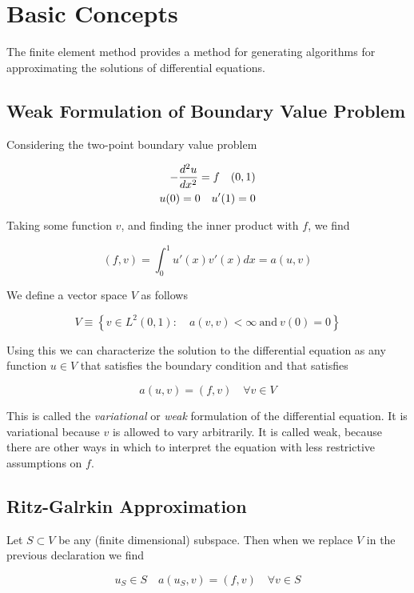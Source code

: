 \documentclass[../FEM.tex]{subfiles}
\begin{document}
\section{Basic Concepts}
\label{sec:basic-concepts}

The finite element method provides a method for generating algorithms
for approximating the solutions of differential equations.

\subsection{Weak Formulation of Boundary Value Problem}
\label{sub:weak-formulation-of-boundary-value-problem}

Considering the two-point boundary value problem

\[
\begin{aligned}
-\frac{d^2 u}{d {x}^2}=f\quad(0,1)\\
u(0)=0\quad u'(1)=0
\end{aligned}
\]

Taking some function \(v\), and finding the inner product with \(f\), we
find

\[
(f,v)=\int_{0}^{1}u'(x)v'(x)dx=a(u,v)
\]

We define a vector space \(V\) as follows

\[
V \equiv \left\{ v\in L^2(0,1):\quad a(v,v)< \infty \ \text{and}\ v(0) = 0\right\}
\]

Using this we can characterize the solution to the differential equation
as any function \(u\in V\) that satisfies the boundary condition and
that satisfies

\[
a(u,v)=(f,v)\quad \forall v\in V
\]

This is called the \emph{variational} or \emph{weak} formulation of the
differential equation. It is variational because \(v\) is allowed to
vary arbitrarily. It is called weak, because there are other ways in
which to interpret the equation with less restrictive assumptions on
\(f\).

\subsection{Ritz-Galrkin Approximation}
\label{sub:ritz-galrkin-approximation}

Let \(S \subset V\) be any (finite dimensional) subspace. Then when we
replace \(V\) in the previous declaration we find

\[
u_S \in S\quad a(u_S,v)=(f,v)\quad \forall v\in S
\]
\end{document}
